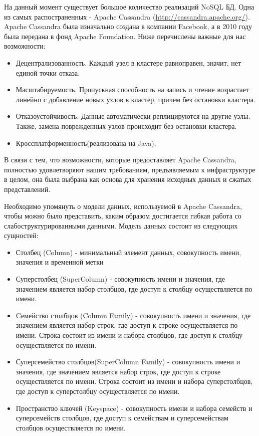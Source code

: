 \documentclass[12pt,a4paper]{extarticle}
\begin{document}
На данный момент существует большое количество реализаций NoSQL БД. Одна из самых распостраненных - Apache Cassandra (\url{http://cassandra.apache.org/}). Apache Cassandra была изначально создана в компании Facebook, а в 2010 году была передана в 
фонд Apache Foundation. Ниже перечислены важные для нас возможности:
\begin{itemize}
	\item Децентрализованность. Каждый узел в кластере равноправен, значит, нет единой точки отказа.
	\item Масштабируемость. Пропускная способность на запись и чтение возрастает линейно с добавление новых узлов в кластер, причем без остановки кластера.
	\item Отказоустойчивость. Данные автоматически реплицируются на другие узлы. Также, замена поврежденных узлов происходит без остановки кластера.
	\item Кроссплатформенность(реализована на Java).
\end{itemize}

В связи с тем, что возможности, которые предоставляет Apache Cassandra, полностью удовлетворяют нашим требованиям, предъявляемым к инфраструктуре в целом, она была выбрана как основа для хранения исходных данных и сжатых представлений.

Необходимо упомянуть о модели данных, используемой в Apache Cassandra, чтобы можно было представить, каким образом достигается гибкая работа со слабоструктурированными данными. Модель данных состоит из следующих сущностей:
\begin{itemize}
	\item Столбец (Column) - минимальный элемент данных, совокупность имени, значения и временной метки
	\item Суперстолбец (SuperColumn) - совокупность имени и значения, где значением является набор столбцов, где доступ к столбцу осуществляется по имени.
	\item Cемейство столбцов (Column Family) - совокупность имени и значения, где значением является набор строк, где доступ к строке осуществляется по имени. Строка состоит из имени и набора столбцов, где доступ к столбцу осуществляется по имени.  
	\item Суперсемейство столбцов(SuperColumn Family) - совокупность имени и значения, где значением является набор строк, где доступ к строке осуществляется по имени. Строка состоит из имени и набора суперстолбцов, где доступ к суперстолбцу осуществляется по имени.
	\item Пространство ключей (Keyspace) - совокупность имени и набора семейств и суперсемейств столбцов, где доступ к семействам и суперсемействам столбцов осуществляется по имени.
\end{itemize}
\end{document}
